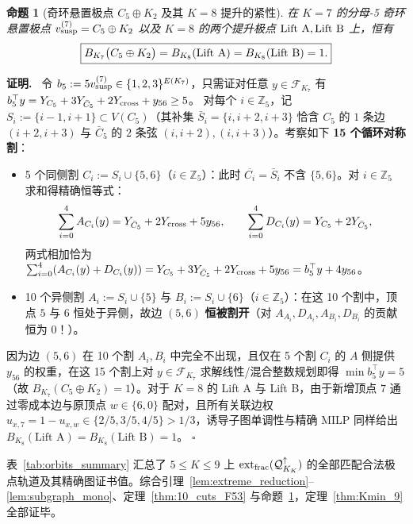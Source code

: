 \documentclass[11pt,a4paper]{ctexart}
\newtheorem{proposition}[theorem]{命题}
\theoremstyle{definition}
\newenvironment{proofcn}{\par\noindent\textbf{证明.}\ }{\hfill$\square$\par}
\newcommand{\1}{\boldsymbol 1}
\newcommand{\0}{\boldsymbol 0}
\begin{document}
\begin{proposition}[奇环悬置极点 $C_5\oplus K_2$ 及其 $K=8$ 提升的紧性]\label{prop:C5_K2_tight}
在 $K=7$ 的分母-5 奇环悬置极点 $v_{\rm susp}^{(7)}=C_5\oplus K_2$ 以及 $K=8$ 的两个提升极点 $\text{\rm Lift A},\text{\rm Lift B}$ 上，恒有
\begin{equation}\label{eq:C5_K2_B1}
 \boxed{B_{K_7}\bigl(C_5\oplus K_2\bigr) = B_{K_8}(\text{\rm Lift A}) = B_{K_8}(\text{\rm Lift B}) = 1.}
\end{equation}
\end{proposition}
\begin{proofcn}
令 $b_5:=5v_{\rm susp}^{(7)}\in\{1,2,3\}^{E(K_7)}$，只需证对任意 $y\in\mathcal F_{K_7}$ 有 $b_5^\top y=Y_{C_5}+3Y_{\bar C_5}+2Y_{\rm cross}+y_{56}\ge 5$。
对每个 $i\in\mathbb Z_5$，记 $S_i:=\{i-1,i+1\}\subset V(C_5)$（其补集 $\bar S_i=\{i,i+2,i+3\}$ 恰含 $C_5$ 的 $1$ 条边 $(i+2,i+3)$ 与 $\bar C_5$ 的 $2$ 条弦 $(i,i+2),(i,i+3)$）。考察如下 \textbf{15 个循环对称割}：
\begin{itemize}
\item 5 个同侧割 $C_i:=S_i\cup\{5,6\}$（$i\in\mathbb Z_5$）：此时 $\overline{C_i}=\bar S_i$ 不含 $\{5,6\}$。对 $i\in\mathbb Z_5$ 求和得精确恒等式：
\begin{equation}\label{eq:15cut_C}
 \sum_{i=0}^4 A_{C_i}(y) = Y_{\bar C_5} + 2Y_{\rm cross} + 5y_{56},\qquad
 \sum_{i=0}^4 D_{C_i}(y) = Y_{C_5} + 2Y_{\bar C_5},
\end{equation}
两式相加恰为 $\sum_{i=0}^4(A_{C_i}(y)+D_{C_i}(y)) = Y_{C_5}+3Y_{\bar C_5}+2Y_{\rm cross}+5y_{56} = b_5^\top y + 4y_{56}$。
\item 10 个异侧割 $A_i:=S_i\cup\{5\}$ 与 $B_i:=S_i\cup\{6\}$（$i\in\mathbb Z_5$）：在这 10 个割中，顶点 $5$ 与 $6$ 恒处于异侧，故边 $(5,6)$ \textbf{恒被割开}（对 $A_{A_i},D_{A_i},A_{B_i},D_{B_i}$ 的贡献恒为 $0$！）。
\end{itemize}
因为边 $(5,6)$ 在 10 个割 $A_i,B_i$ 中完全不出现，且仅在 5 个割 $C_i$ 的 $A$ 侧提供 $y_{56}$ 的权重，在这 15 个割上对 $y\in\mathcal F_{K_7}$ 求解线性/混合整数规划即得 $\min b_5^\top y=5$（故 $B_{K_7}(C_5\oplus K_2)=1$）。对于 $K=8$ 的 Lift A 与 Lift B，由于新增顶点 $7$ 通过零成本边与原顶点 $w\in\{6,0\}$ 配对，且所有关联边权 $u_{x,7}=1-u_{x,w}\in\{2/5,3/5,4/5\}>1/3$，诱导子图单调性与精确 MILP 同样给出 $B_{K_8}(\text{Lift A})=B_{K_8}(\text{Lift B})=1$。
\end{proofcn}

表~\ref{tab:orbits_summary} 汇总了 $5\le K\le 9$ 上 $\operatorname{ext}_{\rm frac}(\mathcal Q_{K_K}^{\uparrow})$ 的全部匹配合法极点轨道及其精确图证书值。综合引理~\ref{lem:extreme_reduction}--\ref{lem:subgraph_mono}、定理~\ref{thm:10_cuts_F53} 与命题~\ref{prop:C5_K2_tight}，定理~\ref{thm:Kmin_9} 全部证毕。
\end{document}
